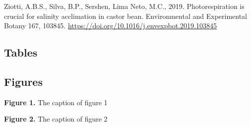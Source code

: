 \documentclass[
  12pt,
  letterpaper,
  DIV=11,
  numbers=noendperiod]{scrartcl}
\newlength{\cslhangindent}
\newlength{\cslentryspacingunit} %
\newenvironment{CSLReferences}[2] %
 {%
  \setlength{\parindent}{0pt}
  \ifodd #1
  \let\oldpar\par
  \def\par{\hangindent=\cslhangindent\oldpar}
  \fi
  \setlength{\parskip}{#2\cslentryspacingunit}
 }%
 {}
\begin{document}
\begin{CSLReferences}{1}{0}
\leavevmode{}%
Ziotti, A.B.S., Silva, B.P., Sershen, Lima Neto, M.C., 2019.
Photorespiration is crucial for salinity acclimation in castor bean.
Environmental and Experimental Botany 167, 103845.
\url{https://doi.org/10.1016/j.envexpbot.2019.103845}

\end{CSLReferences}

\newpage

\hypertarget{tables}{%
\subsection{Tables}\label{tables}}

\hypertarget{figures}{%
\subsection{Figures}\label{figures}}

\textbf{Figure 1.} The caption of figure 1

\newpage

\textbf{Figure 2.} The caption of figure 2
\end{document}

